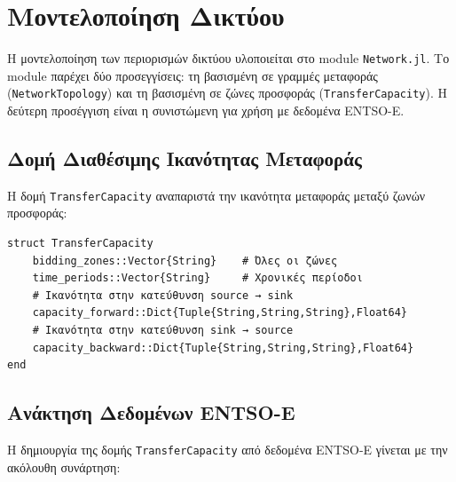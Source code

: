 \section{Μοντελοποίηση Δικτύου}
\label{sec:network-modeling}

Η μοντελοποίηση των περιορισμών δικτύου υλοποιείται στο module \texttt{Network.jl}. Το module παρέχει δύο προσεγγίσεις: τη βασισμένη σε γραμμές μεταφοράς (\texttt{NetworkTopology}) και τη βασισμένη σε ζώνες προσφοράς (\texttt{TransferCapacity}). Η δεύτερη προσέγγιση είναι η συνιστώμενη για χρήση με δεδομένα ENTSO-E.

\subsection{Δομή Διαθέσιμης Ικανότητας Μεταφοράς}
\label{subsec:transfer-capacity-struct}

Η δομή \texttt{TransferCapacity} αναπαριστά την ικανότητα μεταφοράς μεταξύ ζωνών προσφοράς:

\begin{samepage}
\begin{verbatim}
struct TransferCapacity
    bidding_zones::Vector{String}    # Όλες οι ζώνες
    time_periods::Vector{String}     # Χρονικές περίοδοι
    # Ικανότητα στην κατεύθυνση source → sink
    capacity_forward::Dict{Tuple{String,String,String},Float64}
    # Ικανότητα στην κατεύθυνση sink → source
    capacity_backward::Dict{Tuple{String,String,String},Float64}
end
\end{verbatim}
\end{samepage}

\subsection{Ανάκτηση Δεδομένων ENTSO-E}
\label{subsec:entsoe-data-retrieval}

Η δημιουργία της δομής \texttt{TransferCapacity} από δεδομένα ENTSO-E γίνεται με την ακόλουθη συνάρτηση:

